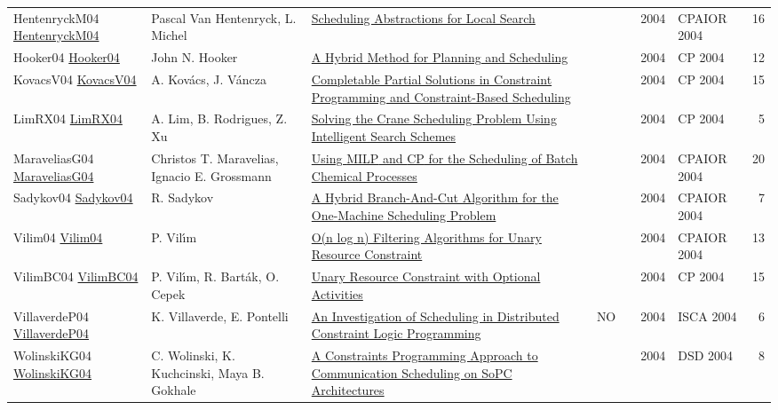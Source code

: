 {\begin{longtable}{p{3cm}p{6cm}p{7cm}rrrp{3cm}r}
HentenryckM04 \href{https://doi.org/10.1007/978-3-540-24664-0\_22}{HentenryckM04} & Pascal Van Hentenryck, L. Michel & \href{papers/HentenryckM04.pdf}{Scheduling Abstractions for Local Search} &  & \cite{HentenryckM04} & 2004 & CPAIOR 2004 & 16\\
Hooker04 \href{https://doi.org/10.1007/978-3-540-30201-8\_24}{Hooker04} & John N. Hooker & \href{papers/Hooker04.pdf}{A Hybrid Method for Planning and Scheduling} &  & \cite{Hooker04} & 2004 & CP 2004 & 12\\
KovacsV04 \href{https://doi.org/10.1007/978-3-540-30201-8\_26}{KovacsV04} & A. Kov{\'{a}}cs, J. V{\'{a}}ncza & \href{papers/KovacsV04.pdf}{Completable Partial Solutions in Constraint Programming and Constraint-Based Scheduling} &  & \cite{KovacsV04} & 2004 & CP 2004 & 15\\
LimRX04 \href{https://doi.org/10.1007/978-3-540-30201-8\_59}{LimRX04} & A. Lim, B. Rodrigues, Z. Xu & \href{papers/LimRX04.pdf}{Solving the Crane Scheduling Problem Using Intelligent Search Schemes} &  & \cite{LimRX04} & 2004 & CP 2004 & 5\\
MaraveliasG04 \href{https://doi.org/10.1007/978-3-540-24664-0\_1}{MaraveliasG04} & Christos T. Maravelias, Ignacio E. Grossmann & \href{papers/MaraveliasG04.pdf}{Using {MILP} and {CP} for the Scheduling of Batch Chemical Processes} &  & \cite{MaraveliasG04} & 2004 & CPAIOR 2004 & 20\\
Sadykov04 \href{https://doi.org/10.1007/978-3-540-24664-0\_31}{Sadykov04} & R. Sadykov & \href{papers/Sadykov04.pdf}{A Hybrid Branch-And-Cut Algorithm for the One-Machine Scheduling Problem} &  & \cite{Sadykov04} & 2004 & CPAIOR 2004 & 7\\
Vilim04 \href{https://doi.org/10.1007/978-3-540-24664-0\_23}{Vilim04} & P. Vil{\'{\i}}m & \href{papers/Vilim04.pdf}{O(n log n) Filtering Algorithms for Unary Resource Constraint} &  & \cite{Vilim04} & 2004 & CPAIOR 2004 & 13\\
VilimBC04 \href{https://doi.org/10.1007/978-3-540-30201-8\_8}{VilimBC04} & P. Vil{\'{\i}}m, R. Bart{\'{a}}k, O. Cepek & \href{papers/VilimBC04.pdf}{Unary Resource Constraint with Optional Activities} &  & \cite{VilimBC04} & 2004 & CP 2004 & 15\\
VillaverdeP04 \href{}{VillaverdeP04} & K. Villaverde, E. Pontelli & \href{papers/VillaverdeP04.pdf}{An Investigation of Scheduling in Distributed Constraint Logic Programming} & NO & \cite{VillaverdeP04} & 2004 & ISCA 2004 & 6\\
WolinskiKG04 \href{https://doi.org/10.1109/DSD.2004.1333291}{WolinskiKG04} & C. Wolinski, K. Kuchcinski, Maya B. Gokhale & \href{papers/WolinskiKG04.pdf}{A Constraints Programming Approach to Communication Scheduling on SoPC Architectures} &  & \cite{WolinskiKG04} & 2004 & DSD 2004 & 8\\

\end{longtable}}
